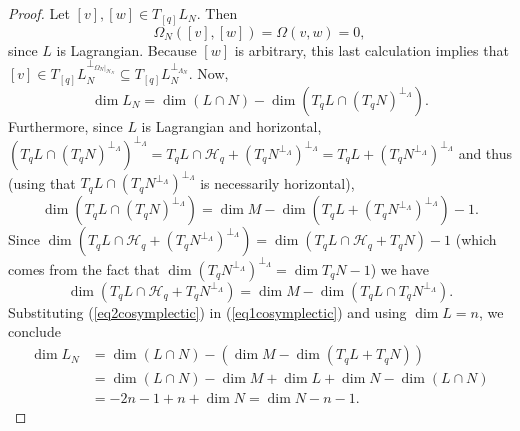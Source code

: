 \documentclass[12pt]{article}
\renewcommand{\dim}{\operatorname{dim}}
\begin{document}
\begin{proof}
Let $[v], [w] \in T_{[q]}L_N$. Then $$\Omega_N([v],[w]) = \Omega(v,w) = 0,$$ since $L$ is Lagrangian. Because $[w]$ is arbitrary, this last calculation implies that $[v] \in T_{[q]}L_N^{\perp_{\Omega_N|_{\mathcal{H}_N}}} \subseteq T_{[q]}L_N^{\perp_{\Lambda_N}}$. Now, 
\begin{equation}\label{eq1cosymplectic}
\dim L_N = \dim (L \cap N) - \dim (T_qL \cap (T_qN)^{\perp_\Lambda}).
\end{equation}
Furthermore, since $L$ is Lagrangian and horizontal, $(T_qL \cap (T_qN)^{\perp_\Lambda})^{\perp_\Lambda} = T_qL \cap \mathcal{H}_q + (T_qN^{\perp_\Lambda})^{\perp_\Lambda} = T_qL + (T_qN^{\perp_\Lambda})^{\perp_\Lambda}$ and thus (using that $T_qL \cap (T_qN^{\perp_\Lambda})^{\perp_\Lambda}$ is necessarily horizontal),
\begin{equation*}
\dim (T_qL \cap (T_qN)^{\perp_\Lambda}) = \dim M - \dim(T_qL + (T_qN^{\perp_\Lambda})^{\perp_\Lambda}) - 1.
\end{equation*}
Since $\dim(T_qL\cap \mathcal{H}_q + (T_qN^{\perp_\Lambda})^{\perp_\Lambda}) = \dim(T_qL\cap \mathcal{H}_q + T_qN) - 1$ (which comes from the fact that $\dim (T_qN^{\perp_\Lambda})^{\perp_\Lambda} = \dim T_qN - 1$) we have
\begin{equation}\label{eq2cosymplectic}
\dim(T_qL \cap \mathcal{H}_q + T_qN^{\perp_\Lambda}) = \dim M - \dim(T_qL \cap T_qN^{\perp_\Lambda}).
\end{equation}
Substituting (\ref{eq2cosymplectic}) in (\ref{eq1cosymplectic}) and using $\dim L = n$, we conclude 
\begin{align*}
\dim L_N &= \dim (L \cap N) - \left ( \dim M - \dim(T_qL + T_qN)\right) \\
	&=  \dim (L \cap N) - \dim M   + \dim L + \dim N - \dim(L \cap N)\\
	&= -2n -1 + n + \dim N = \dim N - n - 1.
\end{align*}
\end{proof}
\end{document}
